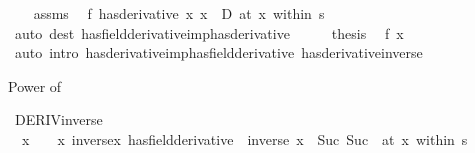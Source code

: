 \begin{isabellebody}
\ \ \isamarkupfalse%
\ assms\ \isamarkupfalse%
\ {\isachardoublequoteopen}{\isacharparenleft}{\kern0pt}f\ has{\isacharunderscore}{\kern0pt}derivative\ {\isacharparenleft}{\kern0pt}{\isasymlambda}x{\isachardot}{\kern0pt}\ x\ {\isacharasterisk}{\kern0pt}\ D{\isacharparenright}{\kern0pt}{\isacharparenright}{\kern0pt}\ {\isacharparenleft}{\kern0pt}at\ x\ within\ s{\isacharparenright}{\kern0pt}{\isachardoublequoteclose}\isanewline
\ \ \ \ \isamarkupfalse%
\ {\isacharparenleft}{\kern0pt}auto\ dest{\isacharbang}{\kern0pt}{\isacharcolon}{\kern0pt}\ has{\isacharunderscore}{\kern0pt}field{\isacharunderscore}{\kern0pt}derivative{\isacharunderscore}{\kern0pt}imp{\isacharunderscore}{\kern0pt}has{\isacharunderscore}{\kern0pt}derivative{\isacharparenright}{\kern0pt}\isanewline
\ \ \isamarkupfalse%
\ \isamarkupfalse%
\ {\isacharquery}{\kern0pt}thesis\ \isamarkupfalse%
\ {\isacartoucheopen}f\ x\ {\isasymnoteq}\ {}{\isacartoucheclose}\isanewline
\ \ \ \ \isamarkupfalse%
\ {\isacharparenleft}{\kern0pt}auto\ intro{\isacharcolon}{\kern0pt}\ has{\isacharunderscore}{\kern0pt}derivative{\isacharunderscore}{\kern0pt}imp{\isacharunderscore}{\kern0pt}has{\isacharunderscore}{\kern0pt}field{\isacharunderscore}{\kern0pt}derivative\ has{\isacharunderscore}{\kern0pt}derivative{\isacharunderscore}{\kern0pt}inverse{\isacharparenright}{\kern0pt}\isanewline
{}\isamarkupfalse%
%
\endisatagproof
{\isafoldproof}%
%
\isadelimproof
%
\endisadelimproof
%
\begin{isamarkuptext}%
Power of %
\end{isamarkuptext}\isamarkuptrue%
\isamarkupfalse%
\ DERIV{\isacharunderscore}{\kern0pt}inverse{\isacharcolon}{\kern0pt}\isanewline
\ \ {\isachardoublequoteopen}x\ {\isasymnoteq}\ {}\ {\isasymLongrightarrow}\ {\isacharparenleft}{\kern0pt}{\isacharparenleft}{\kern0pt}{\isasymlambda}x{\isachardot}{\kern0pt}\ inverse{\isacharparenleft}{\kern0pt}x{\isacharparenright}{\kern0pt}{\isacharparenright}{\kern0pt}\ has{\isacharunderscore}{\kern0pt}field{\isacharunderscore}{\kern0pt}derivative\ {\isacharminus}{\kern0pt}\ {\isacharparenleft}{\kern0pt}inverse\ x\ {\isacharcircum}{\kern0pt}\ Suc\ {\isacharparenleft}{\kern0pt}Suc\ {}{\isacharparenright}{\kern0pt}{\isacharparenright}{\kern0pt}{\isacharparenright}{\kern0pt}\ {\isacharparenleft}{\kern0pt}at\ x\ within\ s{\isacharparenright}{\kern0pt}{\isachardoublequoteclose}\isanewline

\end{isabellebody}
